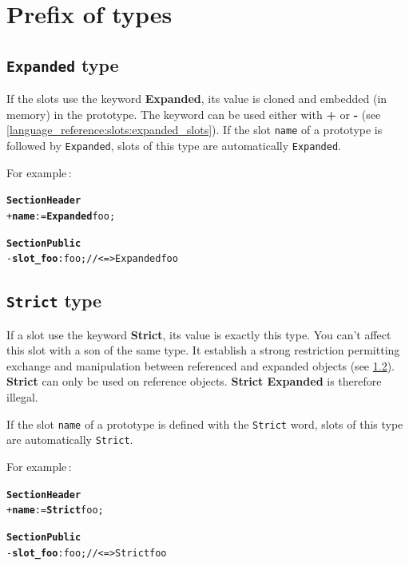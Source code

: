 \documentclass[11pt]{mybook}
\begin{document}
\section{Prefix of types}
\label{language_reference:prefix_types}

\subsection{{\tt{}Expanded} type}
\label{language_reference:type_names:expanded_type}
If the slots use the keyword {\bf{}Expanded}, its value is cloned and embedded (in memory) in the prototype.
The keyword can be used either with {\bf{}+} or {\bf{}-} (see \ref{language_reference:slots:expanded_slots}).
If the slot {\tt{}name} of a prototype is followed by {\tt{}Expanded}, slots of this type are automatically
{\tt{}Expanded}.

For example\,:\\
\begin{alltt}
{\bf{}Section Header}
  + {\bf{}name} := {\bf{}Expanded} {\sc{}foo};

{\bf{}Section Public}
  - {\bf{}slot\_foo}:{\sc{}foo}; // <=> Expanded {\sc{}foo}
\end{alltt}

\subsection{{\tt{}Strict} type}
\label{language_reference:type_names:strict_type}

If a slot use the keyword {\bf{}Strict}, its value is exactly this type.
You can't affect this slot with a son of the same type. It establish a strong restriction
permitting exchange and manipulation between referenced and expanded objects
(see \ref{language_reference:type_names:strict_type}). {\bf{}Strict} can only be used on reference objects.
{\bf{}Strict Expanded} is therefore illegal.

If the slot {\tt{}name} of a prototype is defined with the {\tt{}Strict} word, slots of this type are 
automatically {\tt{}Strict}.

For example\,:\\
\begin{alltt}
{\bf{}Section Header}
  + {\bf{}name} := {\bf{}Strict} {\sc{}foo};

{\bf{}Section Public}
  - {\bf{}slot\_foo}:{\sc{}foo}; // <=> Strict {\sc{}foo}
\end{alltt}
\end{document}
